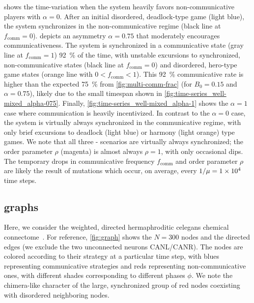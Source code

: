 \documentclass[pdflatex,lineno,referee,sn-nature]{sn-jnl}
\begin{document}
 shows the time-variation
when the system heavily favors non-communicative players
with $\alpha = 0$.
After an initial disordered, deadlock-type game (light blue),
the system synchronizes in the non-communicative regime
(black line at $f_{\text{comm}} = 0$).
 depicts an asymmetry $\alpha = 0.75$
that moderately encourages communicativeness.
The system is synchronized in a communicative state
(gray line at $f_{\text{comm}} = 1$) \SI{92}{\percent} of the time,
with unstable excursions to synchronized, non-communicative states
(black line at $f_{\text{comm}} = 0$)
and disordered, hero-type game states
(orange line with $0 < f_{\text{comm}} < 1$).
This \SI{92}{\percent} communicative rate is higher than the expected \SI{75}{\percent}
from \cref{fig:multi-comm-frac} (for $B_0 = 0.15$ and $\alpha = 0.75$),
likely due to the small timespan shown in
\cref{fig:time-series_well-mixed_alpha-075}.
Finally, \cref{fig:time-series_well-mixed_alpha-1} shows the
$\alpha = 1$ case where communication is heavily incentivized.
In contrast to the  $\alpha = 0$ case,
the system is virtually always synchronized in the communicative regime,
with only brief excursions to deadlock (light blue)
or harmony (light orange) type games.
We note that all three
-
scenarios are virtually always synchronized;
the order parameter $\rho$ (magenta) is almost always $\rho = 1$,
with only occasional dips.
The temporary drops in communicative frequency $f_{\text{comm}}$
and order parameter $\rho$ are likely the result of mutations
which occur, on average, every $1/\mu = \num{1E4}$ time steps.

\subsection{ graphs}\label{sec:elegans_graph}

Here, we consider the weighted, directed hermaphroditic \gls{celegans}
chemical connectome~\citep{cook2019whole}.
For reference, \cref{fig:graph} shows the $N = 300$ nodes and the directed edges
(we exclude the two unconnected neurons CANL/CANR).
The nodes are colored according to their strategy at a particular time step,
with blues representing communicative strategies
and reds representing non-communicative ones,
with different shades corresponding to different phases $\phi$.
We note the chimera-like character
of the large, synchronized group of red nodes
coexisting with disordered neighboring nodes.
\end{document}
